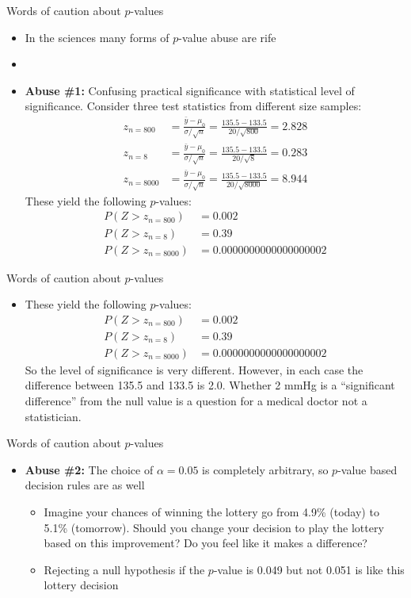 \documentclass[xcolor=dvipsnames]{beamer}
\begin{document}
\begin{frame}{Words of caution about $p$-values}
	\begin{itemize}
		\item In the sciences many forms of $p$-value abuse are rife
		\item[]
		\item \textbf{Abuse \#1:} Confusing practical significance with statistical level of significance. Consider three test statistics from different size samples:
		\begin{align*}
		z_{n=800} &= \frac{\bar{y} - \mu_0}{\sigma / \sqrt{n}} = \frac{135.5 - 133.5}{20 / \sqrt{800}} = 2.828 \\
		z_{n=8} &= \frac{\bar{y} - \mu_0}{\sigma / \sqrt{n}} = \frac{135.5 - 133.5}{20 / \sqrt{8}} = 0.283 \\
		z_{n=8000} &= \frac{\bar{y} - \mu_0}{\sigma / \sqrt{n}} = \frac{135.5 - 133.5}{20 / \sqrt{8000}} = 8.944
		\end{align*}
		These yield the following $p$-values:
		\begin{align*}
			P(Z >z_{n=800}) &= 0.002 \\
			P(Z >z_{n=8}) &= 0.39 \\
			P(Z >z_{n=8000}) &= 0.0000000000000000002
		\end{align*}
	\end{itemize}
\end{frame}

\begin{frame}{Words of caution about $p$-values}
\begin{itemize}
	\item These yield the following $p$-values:
	\begin{align*}
	P(Z >z_{n=800}) &= 0.002 \\
	P(Z >z_{n=8}) &= 0.39 \\
	P(Z >z_{n=8000}) &= 0.0000000000000000002
	\end{align*}
	So the level of significance is very different. However, in each case the difference between 135.5 and 133.5 is 2.0. Whether 2 mmHg is a ``significant difference'' from the null value is a question for a medical doctor not a statistician.
\end{itemize}
\end{frame}

\begin{frame}{Words of caution about $p$-values}
	\begin{itemize}
		\item \textbf{Abuse \#2:} The choice of $\alpha = 0.05$ is completely arbitrary, so $p$-value based decision rules are as well
		\begin{itemize}
			\item Imagine your chances of winning the lottery go from 4.9\% (today) to 5.1\% (tomorrow). Should you change your decision to play the lottery based on this improvement? Do you feel like it makes a difference?
			\item Rejecting a null hypothesis if the $p$-value is 0.049 but not 0.051 is like this lottery decision
		\end{itemize}
	\end{itemize}
\end{frame}
\end{document}
